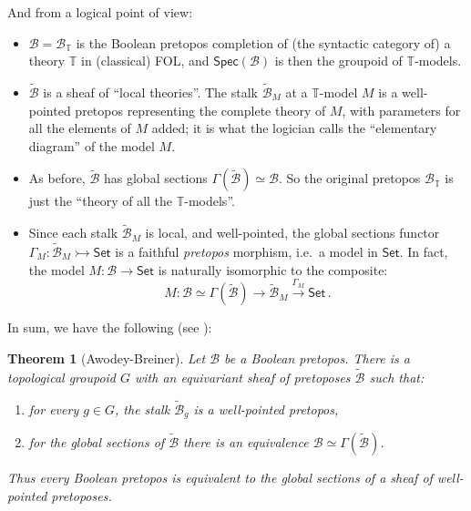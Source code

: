 \documentclass[12pt]{article}
\newcommand{\B}{\ensuremath{\mathcal{B}}}
\newcommand{\T}{\ensuremath{\mathbb{T}}}
\newcommand{\Set}{\ensuremath{\mathsf{Set}}}
\newtheorem*{theorem*}{Theorem}
\theoremstyle{remark}
\theoremstyle{definition}
\begin{document}
And from a logical point of view:
\begin{itemize}
\item $\mathcal{B}= \mathcal{B}_\T$ is the Boolean pretopos completion of (the syntactic category of) a theory $\T$ in (classical) FOL, and  
$\mathsf{Spec}(\mathcal{B})$ is then the groupoid of $\T$-models.

\item $\widetilde{\mathcal{B}}$ is a sheaf of ``local theories''.  The stalk $\widetilde{\mathcal{B}}_M$ at a $\T$-model $M$ is a well-pointed pretopos representing the complete theory of $M$, with parameters for all the elements of $M$ added; it is what the logician calls the ``elementary diagram'' of the model $M$.

\item As before, $\widetilde{\mathcal{B}}$ has global sections $\Gamma(\widetilde{\mathcal{B}}) \simeq \mathcal{B}$.  So the original pretopos $\mathcal{B}_\T$ is just the ``theory of all the $\T$-models''.

\item Since each stalk $\widetilde{\mathcal{B}}_M$ is local, and well-pointed,  the global sections functor $\Gamma_M : \widetilde{\mathcal{B}}_M \rightarrowtail \Set$ is a faithful \emph{pretopos} morphism, i.e.\ a model in $\Set$.  In fact, the model $M:\mathcal{B}\to\Set$  is naturally  isomorphic to the composite:
\[
M : \mathcal{B} \simeq \Gamma(\widetilde{\mathcal{B}}) \to \widetilde{\mathcal{B}}_M \stackrel{\Gamma_M}{\to} \Set\,.
\]
\end{itemize}

In sum, we have the following (see \cite{B}):

\begin{theorem*}[Awodey-Breiner]
Let $\B$ be a Boolean pretopos.  
There is a topological groupoid $G$ with an equivariant sheaf of pretoposes $\widetilde{\B}$ such that:
\begin{enumerate}
\item for every $g\in G$, the stalk $\widetilde{\B}_g$ is a well-pointed pretopos, 
\item for the global sections of $\widetilde{\B}$ there is an equivalence $\B\simeq\Gamma(\widetilde{\B})$.
\end{enumerate}
Thus every Boolean pretopos is equivalent to the global sections of a sheaf of well-pointed pretoposes.  
\end{theorem*}
\medskip
\end{document}
